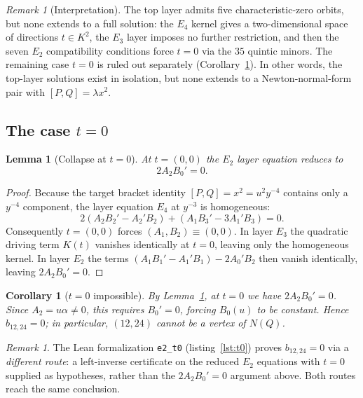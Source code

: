 \documentclass[a4paper,11pt]{article}
\theoremstyle{plain}
\newtheorem{lemma}[theorem]{Lemma}
\newtheorem{corollary}[theorem]{Corollary}
\theoremstyle{definition}
\theoremstyle{remark}
\newtheorem{remark}[theorem]{Remark}
\begin{document}
\begin{remark}[Interpretation]
The top layer admits five characteristic-zero orbits, but none extends to a full solution: the $E_4$ kernel gives a two-dimensional space of directions $t\in K^2$, the $E_3$ layer imposes no further restriction, and then the seven $E_2$ compatibility conditions force $t=0$ via the $35$ quintic minors. The remaining case $t=0$ is ruled out separately (Corollary~\ref{cor:t0}). In other words, the top-layer solutions exist in isolation, but none extends to a Newton-normal-form pair with $[P,Q]=\lambda x^2$.
\end{remark}

\subsection{\texorpdfstring{The case $t=0$}{The case t=0}}

\begin{lemma}[Collapse at $t=0$]\label{lem:t0-collapse}
At $t=(0,0)$ the $E_2$ layer equation reduces to
\[
2A_2B_0'=0.
\]
\end{lemma}
\begin{proof}
Because the target bracket identity $[P,Q]=x^2=u^2y^{-4}$ contains only a $y^{-4}$ component, the layer equation $E_4$ at $y^{-3}$ is homogeneous:
\[
2(A_2B_2'-A_2'B_2)+(A_1B_3'-3A_1'B_3)=0.
\]
Consequently $t=(0,0)$ forces $(A_1,B_2)\equiv(0,0)$. In layer $E_3$ the quadratic driving term $K(t)$ vanishes identically at $t=0$, leaving only the homogeneous kernel. In layer $E_2$ the terms $(A_1B_1'-A_1'B_1)-2A_0'B_2$ then vanish identically, leaving $2A_2B_0'=0$.
\end{proof}

\begin{corollary}[$t=0$ impossible]\label{cor:t0}
By Lemma~\ref{lem:t0-collapse}, at $t=0$ we have $2A_2B_0'=0$. Since $A_2=u\alpha\neq0$, this requires $B_0'=0$, forcing $B_0(u)$ to be constant. Hence $b_{12,24}=0$; in particular, $(12,24)$ cannot be a vertex of $N(Q)$.
\end{corollary}

\begin{remark}
The Lean formalization \texttt{e2\_t0} (listing~\ref{lst:t0}) proves $b_{12,24}=0$ via a \emph{different route}: a left-inverse certificate on the reduced $E_2$ equations with $t=0$ supplied as hypotheses, rather than the $2A_2B_0'=0$ argument above. Both routes reach the same conclusion.
\end{remark}
\end{document}
